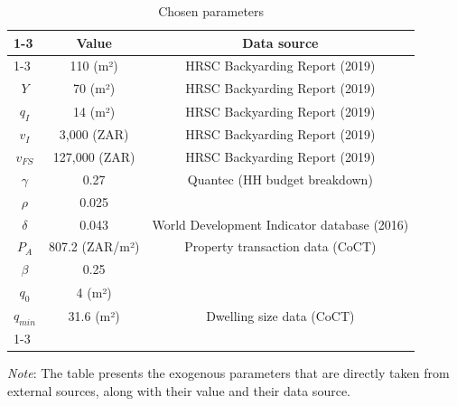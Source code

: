 \documentclass[12pt]{article}
\begin{document}
\begin{table}[h]
\begin{center}
\caption{Chosen parameters}
\label{tab_ext_calib}
\begin{tabular}{lll}
\cline{1-3}
\multicolumn{1}{c}{Parameter} &
\multicolumn{1}{c}{Value} &
\multicolumn{1}{c}{Data source}\\
\cline{1-3}
\multicolumn{1}{c}{$q_{FS}$} &
\multicolumn{1}{c}{110 (m²)} &
\multicolumn{1}{c}{HRSC Backyarding Report (2019)}\\
\multicolumn{1}{c}{$Y$} &
\multicolumn{1}{c}{70 (m²)} &
\multicolumn{1}{c}{HRSC Backyarding Report (2019)}\\
\multicolumn{1}{c}{$q_{I}$} &
\multicolumn{1}{c}{14 (m²)} &
\multicolumn{1}{c}{HRSC Backyarding Report (2019)}\\
\multicolumn{1}{c}{$v_{I}$} &
\multicolumn{1}{c}{3,000 (ZAR)} &
\multicolumn{1}{c}{HRSC Backyarding Report (2019)}\\
\multicolumn{1}{c}{$v_{FS}$} &
\multicolumn{1}{c}{127,000 (ZAR)} &
\multicolumn{1}{c}{HRSC Backyarding Report (2019)}\\
\multicolumn{1}{c}{$\gamma$} &
\multicolumn{1}{c}{0.27} &
\multicolumn{1}{c}{Quantec (HH budget breakdown)}\\
\multicolumn{1}{c}{$\rho$} &
\multicolumn{1}{c}{0.025} &
\multicolumn{1}{c}{\citet{Viguie2014DownscalingParis}}\\
\multicolumn{1}{c}{$\delta$} &
\multicolumn{1}{c}{0.043} &
\multicolumn{1}{c}{World Development Indicator database (2016)}\\
\multicolumn{1}{c}{$P_A$} &
\multicolumn{1}{c}{807.2 (ZAR/m²)} &
\multicolumn{1}{c}{Property transaction data (CoCT)}\\
\multicolumn{1}{c}{$\beta$} &
\multicolumn{1}{c}{0.25} &
\multicolumn{1}{c}{\citet{Finlay2022HousingSorting}}\\
\multicolumn{1}{c}{$q_0$} &
\multicolumn{1}{c}{4 (m²)} &
\multicolumn{1}{c}{\citet{Rice2023RentingAfrica}}\\
\multicolumn{1}{c}{$q_{min}$} &
\multicolumn{1}{c}{31.6 (m²)} &
\multicolumn{1}{c}{Dwelling size data (CoCT)}\\
\cline{1-3}
\end{tabular}
\end{center}
{\scriptsize \textit{Note}: The table presents the exogenous parameters that are directly taken from external sources, along with their value and their data source.}{\scriptsize\par}
\end{table}
\end{document}
